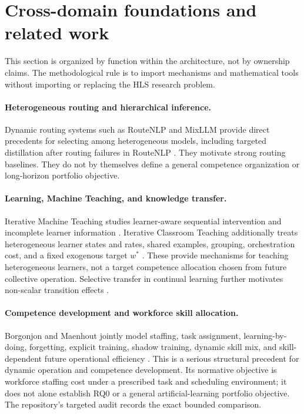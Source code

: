 \section{Cross-domain foundations and related work}

This section is organized by function within the architecture, not by ownership claims. The methodological rule is to import mechanisms and mathematical tools without importing or replacing the HLS research problem.

\paragraph{Heterogeneous routing and hierarchical inference.} Dynamic routing systems such as RouteNLP and MixLLM provide direct precedents for selecting among heterogeneous models, including targeted distillation after routing failures in RouteNLP \citep{guo2026routenlp,wang2025mixllm}. They motivate strong routing baselines. They do not by themselves define a general competence organization or long-horizon portfolio objective.

\paragraph{Learning, Machine Teaching, and knowledge transfer.} Iterative Machine Teaching studies learner-aware sequential intervention and incomplete learner information \citep{liu2017iterative,liu2018blackbox}. Iterative Classroom Teaching additionally treats heterogeneous learner states and rates, shared examples, grouping, orchestration cost, and a fixed exogenous target $w^*$ \citep{yeo2019iterativeclassroom}. These provide mechanisms for teaching heterogeneous learners, not a target competence allocation chosen from future collective operation. Selective transfer in continual learning further motivates non-scalar transition effects \citep{lee2021sharing}.

\paragraph{Competence development and workforce skill allocation.} Borgonjon and Maenhout jointly model staffing, task assignment, learning-by-doing, forgetting, explicit training, shadow training, dynamic skill mix, and skill-dependent future operational efficiency \citep{borgonjon2024dynamic}. This is a serious structural precedent for dynamic operation and competence development. Its normative objective is workforce staffing cost under a prescribed task and scheduling environment; it does not alone establish RQ0 or a general artificial-learning portfolio objective. The repository's targeted audit records the exact bounded comparison.

